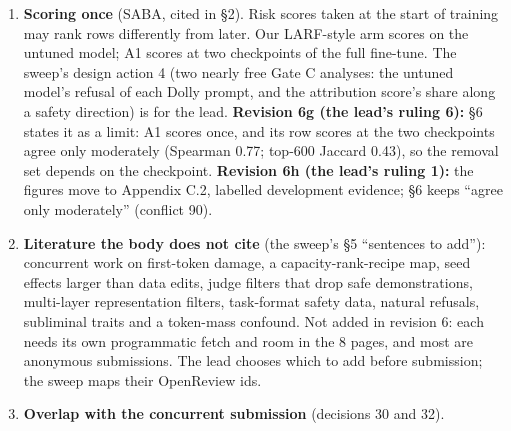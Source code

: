 \documentclass{article}
\theoremstyle{plain}
\theoremstyle{definition}
\theoremstyle{remark}
\begin{document}
\begin{enumerate}
        cost-accounted, not compute-matched, and the shortest-answer rule
        removes fewer tokens than random removal. Answer (the user's rule of 17
        Oct): match tokens per removal arm, or pre-register a token-matched
        analysis beside the row-matched one (\S{}3.2, [TO BE FIXED in the
        stage-1 pre-registration]); report tokens removed and optimizer steps
        per removal arm (the sweep's design action 1); if token matching cannot
        be done, use the fallback title. \textbf{Revision 6c:} answered by UW-14
        (\S{}3.2; Appendix C.3): a token-matched analysis beside the row-matched
        one in any case, and token-matched random removals for A1, L1 and H1 in
        the funded tier. The arms are still cost-accounted, not matched in
        GPU-seconds; the title rests on the token matching (decision 26).
  \item \textbf{Scoring once} (SABA, cited in \S{}2). Risk scores taken at the
        start of training may rank rows differently from later. Our LARF-style
        arm scores on the untuned model; A1 scores at two checkpoints of the
        full fine-tune. The sweep's design action 4 (two nearly free Gate C
        analyses: the untuned model's refusal of each Dolly prompt, and the
        attribution score's share along a safety direction) is for the lead.
        \textbf{Revision 6g (the lead's ruling 6):} \S{}6 states it as a limit:
        A1 scores once, and its row scores at the two checkpoints agree only
        moderately (Spearman 0.77; top-600 Jaccard 0.43), so the removal set
        depends on the checkpoint. \textbf{Revision 6h (the lead's ruling 1):}
        the figures move to Appendix C.2, labelled development evidence; \S{}6
        keeps ``agree only moderately'' (conflict 90).
  \item \textbf{Literature the body does not cite} (the sweep's \S{}5
        ``sentences to add''): concurrent work on first-token damage, a
        capacity-rank-recipe map, seed effects larger than data edits, judge
        filters that drop safe demonstrations, multi-layer representation
        filters, task-format safety data, natural refusals, subliminal traits
        and a token-mass confound. Not added in revision 6: each needs its own
        programmatic fetch and room in the 8 pages, and most are anonymous
        submissions. The lead chooses which to add before submission; the sweep
        maps their OpenReview ids.
  \item \textbf{Overlap with the concurrent submission} (decisions 30 and 32).

\end{enumerate}
\end{document}
